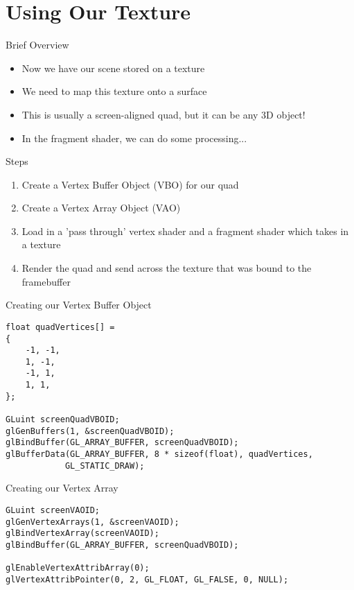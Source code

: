 \part{Using Our Texture}
\frame{\partpage}

\begin{frame}{Brief Overview}
	\begin{itemize}
		\item\pause Now we have our scene stored on a texture
		\item\pause We need to map this texture onto a surface
		\item\pause This is usually a screen-aligned quad, but it can be any 3D object!
		\item\pause In the fragment shader, we can do some processing...
	\end{itemize}
\end{frame}

\begin{frame}{Steps}
	\begin{enumerate}
		\item\pause Create a Vertex Buffer Object (VBO) for our quad
		\item\pause Create a Vertex Array Object (VAO)
		\item\pause Load in a 'pass through' vertex shader and a fragment shader which takes in a texture
		\item\pause Render the quad and send across the texture that was bound to the framebuffer
	\end{enumerate}
\end{frame}

\begin{frame}[fragile]{Creating our Vertex Buffer Object}
	\begin{lstlisting}
float quadVertices[] =
{
	-1, -1,
	1, -1,
	-1, 1,
	1, 1,
};

GLuint screenQuadVBOID;
glGenBuffers(1, &screenQuadVBOID);
glBindBuffer(GL_ARRAY_BUFFER, screenQuadVBOID);
glBufferData(GL_ARRAY_BUFFER, 8 * sizeof(float), quadVertices,
			GL_STATIC_DRAW);
	\end{lstlisting}
\end{frame}

\begin{frame}[fragile]{Creating our Vertex Array}
	\begin{lstlisting}
GLuint screenVAOID;
glGenVertexArrays(1, &screenVAOID);
glBindVertexArray(screenVAOID);
glBindBuffer(GL_ARRAY_BUFFER, screenQuadVBOID);

glEnableVertexAttribArray(0);
glVertexAttribPointer(0, 2, GL_FLOAT, GL_FALSE, 0, NULL);
	\end{lstlisting}
\end{frame}

